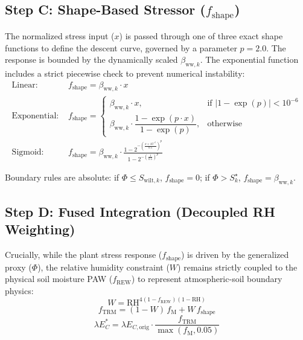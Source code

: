 \documentclass[11pt]{article}
\begin{document}
\subsection*{Step C: Shape-Based Stressor ($f_{\mathrm{shape}}$)}

The normalized stress input ($x$) is passed through one of three exact shape functions to define the descent curve, governed by a parameter $p = 2.0$. The response is bounded by the dynamically scaled $\beta_{\mathrm{ww},k}$. The exponential function includes a strict piecewise check to prevent numerical instability:
\begin{align}
  \text{Linear: } & f_{\mathrm{shape}} = \beta_{\mathrm{ww},k} \cdot x \\
  \text{Exponential: } & f_{\mathrm{shape}} =
  \begin{cases}
    \beta_{\mathrm{ww},k} \cdot x, & \text{if } \left|1 - \exp(p)\right| < 10^{-6} \\
    \beta_{\mathrm{ww},k} \cdot \dfrac{1 - \exp(p \cdot x)}{1 - \exp(p)}, & \text{otherwise}
  \end{cases} \\
  \text{Sigmoid: } & f_{\mathrm{shape}} = \beta_{\mathrm{ww},k} \cdot \frac{1 - 2^{-\left(\frac{x + 10^{-6}}{0.5}\right)^{p}}}{1 - 2^{-\left(\frac{1}{0.5}\right)^{p}}}
\end{align}

Boundary rules are absolute: if $\Phi \le S_{\mathrm{wilt},k}$, $f_{\mathrm{shape}} = 0$; if $\Phi > S^\star_{k}$, $f_{\mathrm{shape}} = \beta_{\mathrm{ww},k}$.

\subsection*{Step D: Fused Integration (Decoupled RH Weighting)}

Crucially, while the plant stress response ($f_{\mathrm{shape}}$) is driven by the generalized proxy ($\Phi$), the relative humidity constraint ($W$) remains strictly coupled to the physical soil moisture PAW ($f_{\mathrm{REW}}$) to represent atmospheric-soil boundary physics:
\begin{equation}
  W = \mathrm{RH}^{4(1-f_{\mathrm{REW}})(1-\mathrm{RH})}
\end{equation}
\begin{equation}
  f_{\mathrm{TRM}} = (1-W)\,f_{\mathrm{M}} + W\,f_{\mathrm{shape}}
\end{equation}
\begin{equation}
  \lambda E_{C}^{\ast} = \lambda E_{C,\mathrm{orig}} \cdot \frac{f_{\mathrm{TRM}}}{\max(f_{\mathrm{M}}, 0.05)}
\end{equation}
\end{document}
